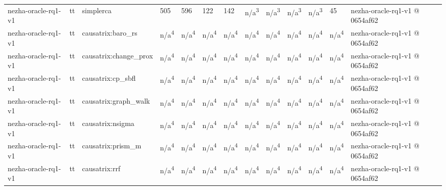 \begin{table}[t]
\begin{tabular}{lllllllllllll}
nezha-oracle-rq1-v1 & tt & simplerca & 505 & 596 & 122 & 142 & n/a\textsuperscript{3} & n/a\textsuperscript{3} & n/a\textsuperscript{3} & n/a\textsuperscript{3} & 45 & nezha-oracle-rq1-v1 @ 0654af62 \\
nezha-oracle-rq1-v1 & tt & causatrix:baro\_rs & n/a\textsuperscript{4} & n/a\textsuperscript{4} & n/a\textsuperscript{4} & n/a\textsuperscript{4} & n/a\textsuperscript{4} & n/a\textsuperscript{4} & n/a\textsuperscript{4} & n/a\textsuperscript{4} & n/a\textsuperscript{4} & nezha-oracle-rq1-v1 @ 0654af62 \\
nezha-oracle-rq1-v1 & tt & causatrix:change\_prox & n/a\textsuperscript{4} & n/a\textsuperscript{4} & n/a\textsuperscript{4} & n/a\textsuperscript{4} & n/a\textsuperscript{4} & n/a\textsuperscript{4} & n/a\textsuperscript{4} & n/a\textsuperscript{4} & n/a\textsuperscript{4} & nezha-oracle-rq1-v1 @ 0654af62 \\
nezha-oracle-rq1-v1 & tt & causatrix:cp\_sbfl & n/a\textsuperscript{4} & n/a\textsuperscript{4} & n/a\textsuperscript{4} & n/a\textsuperscript{4} & n/a\textsuperscript{4} & n/a\textsuperscript{4} & n/a\textsuperscript{4} & n/a\textsuperscript{4} & n/a\textsuperscript{4} & nezha-oracle-rq1-v1 @ 0654af62 \\
nezha-oracle-rq1-v1 & tt & causatrix:graph\_walk & n/a\textsuperscript{4} & n/a\textsuperscript{4} & n/a\textsuperscript{4} & n/a\textsuperscript{4} & n/a\textsuperscript{4} & n/a\textsuperscript{4} & n/a\textsuperscript{4} & n/a\textsuperscript{4} & n/a\textsuperscript{4} & nezha-oracle-rq1-v1 @ 0654af62 \\
nezha-oracle-rq1-v1 & tt & causatrix:nsigma & n/a\textsuperscript{4} & n/a\textsuperscript{4} & n/a\textsuperscript{4} & n/a\textsuperscript{4} & n/a\textsuperscript{4} & n/a\textsuperscript{4} & n/a\textsuperscript{4} & n/a\textsuperscript{4} & n/a\textsuperscript{4} & nezha-oracle-rq1-v1 @ 0654af62 \\
nezha-oracle-rq1-v1 & tt & causatrix:prism\_m & n/a\textsuperscript{4} & n/a\textsuperscript{4} & n/a\textsuperscript{4} & n/a\textsuperscript{4} & n/a\textsuperscript{4} & n/a\textsuperscript{4} & n/a\textsuperscript{4} & n/a\textsuperscript{4} & n/a\textsuperscript{4} & nezha-oracle-rq1-v1 @ 0654af62 \\
nezha-oracle-rq1-v1 & tt & causatrix:rrf & n/a\textsuperscript{4} & n/a\textsuperscript{4} & n/a\textsuperscript{4} & n/a\textsuperscript{4} & n/a\textsuperscript{4} & n/a\textsuperscript{4} & n/a\textsuperscript{4} & n/a\textsuperscript{4} & n/a\textsuperscript{4} & nezha-oracle-rq1-v1 @ 0654af62 \\

\end{tabular}
\end{table}
